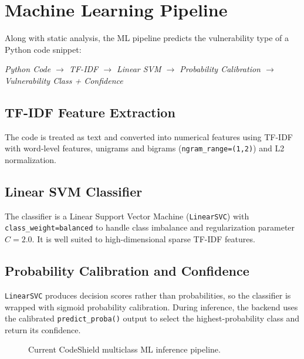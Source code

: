 \documentclass[12pt,a4paper]{report}
\begin{document}
\section{Machine Learning Pipeline}
Along with static analysis, the ML pipeline predicts the vulnerability type of a Python code snippet:

\begin{center}
\textit{Python Code $\rightarrow$ TF-IDF $\rightarrow$ Linear SVM $\rightarrow$ Probability Calibration $\rightarrow$ Vulnerability Class + Confidence}
\end{center}

\subsection{TF-IDF Feature Extraction}
The code is treated as text and converted into numerical features using TF-IDF with word-level features, unigrams and bigrams (\texttt{ngram\_range=(1,2)}) and L2 normalization.

\subsection{Linear SVM Classifier}
The classifier is a Linear Support Vector Machine (\texttt{LinearSVC}) with \texttt{class\_weight=balanced} to handle class imbalance and regularization parameter $C=2.0$. It is well suited to high-dimensional sparse TF-IDF features.

\subsection{Probability Calibration and Confidence}
\texttt{LinearSVC} produces decision scores rather than probabilities, so the classifier is wrapped with sigmoid probability calibration. During inference, the backend uses the calibrated \texttt{predict\_proba()} output to select the highest-probability class and return its confidence.

\begin{figure}[H]
\centering
{}
\caption{Current CodeShield multiclass ML inference pipeline.}
\end{figure}
\end{document}
